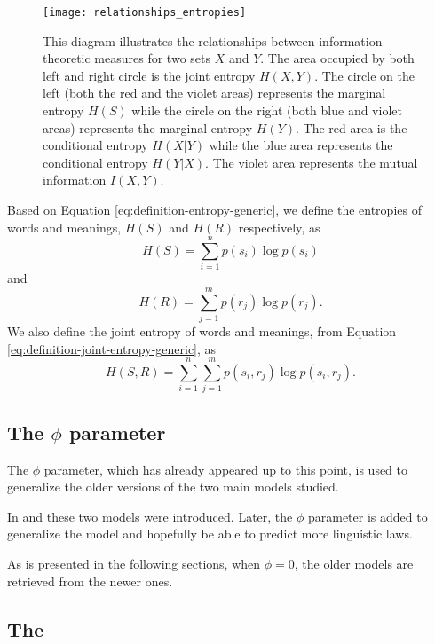 \begin{figure}
  \centering
  \texttt{[image: relationships\_entropies]}
  \caption{
    This diagram illustrates the relationships between information theoretic measures for two sets $X$ and $Y$.
    The area occupied by both left and right circle is the joint entropy $H(X,Y)$.
    The circle on the left (both the red and the violet areas) represents the marginal entropy $H(S)$ while the circle on the right (both blue and violet areas) represents the marginal entropy $H(Y)$.
    The red area is the conditional entropy $H(X|Y)$ while the blue area represents the conditional entropy $H(Y|X)$.
    The violet area represents the mutual information $I(X,Y)$.
  }
  \label{fig:relationships-entropies}
\end{figure}

Based on Equation \eqref{eq:definition-entropy-generic}, we define the entropies of words and meanings, $H(S)$ and $H(R)$ respectively, as
\begin{equation}
  \label{eq:definition-HS}
  H(S) = \sum_{i=1}^n p(s_i) \log p(s_i)
\end{equation}
and
\begin{equation}
  \label{eq:definition-HR}
  H(R) = \sum_{j=1}^m p(r_j) \log p(r_j).
\end{equation}
We also define the joint entropy of words and meanings, from Equation \eqref{eq:definition-joint-entropy-generic}, as
\begin{equation}
  \label{eq:definition-HSR}
  H(S,R) = \sum_{i=1}^n \sum_{j=1}^m p(s_i, r_j) \log p(s_i, r_j).
\end{equation}

\subsection{The $\phi$ parameter}
\label{sec:introduction_model_phi}

The $\phi$ parameter, which has already appeared up to this point, is used to generalize the older versions of the two main models studied.

In \cite{Ferrer2005a} and \cite{Ferrer2003a} these two models were introduced.
Later, the $\phi$ parameter is added to generalize the model and hopefully be able to predict more linguistic laws. \cite{Ferrer2018a}

As is presented in the following sections, when $\phi=0$, the older models are retrieved from the newer ones.

\subsection{The \firstmodel{}}
\label{sec:introduction_model_first-model}

